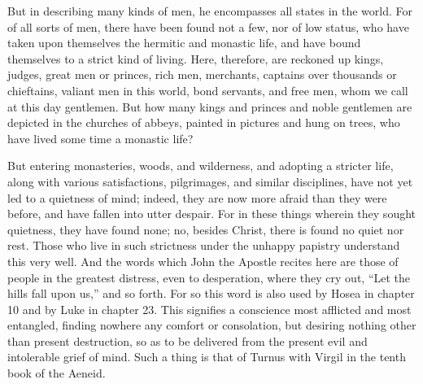 But in describing many kinds of men, he encompasses all states in the world. For of all sorts of men, there have been found not a few, nor of low status, who have taken upon themselves the hermitic and monastic life, and have bound themselves to a strict kind of living. Here, therefore, are reckoned up kings, judges, great men or princes, rich men, merchants, captains over thousands or chieftains, valiant men in this world, bond servants, and free men, whom we call at this day gentlemen. But how many kings and princes and noble gentlemen are depicted in the churches of abbeys, painted in pictures and hung on trees, who have lived some time a monastic life?

But entering monasteries, woods, and wilderness, and adopting a stricter life, along with various satisfactions, pilgrimages, and similar disciplines, have not yet led to a quietness of mind; indeed, they are now more afraid than they were before, and have fallen into utter despair. For in these things wherein they sought quietness, they have found none; no, besides Christ, there is found no quiet nor rest. Those who live in such strictness under the unhappy papistry understand this very well. And the words which John the Apostle recites here are those of people in the greatest distress, even to desperation, where they cry out, “Let the hills fall upon us,” and so forth. For so this word is also used by Hosea in chapter 10 and by Luke in chapter 23. This signifies a conscience most afflicted and most entangled, finding nowhere any comfort or consolation, but desiring nothing other than present destruction, so as to be delivered from the present evil and intolerable grief of mind. Such a thing is that of Turnus with Virgil in the tenth book of the Aeneid.

